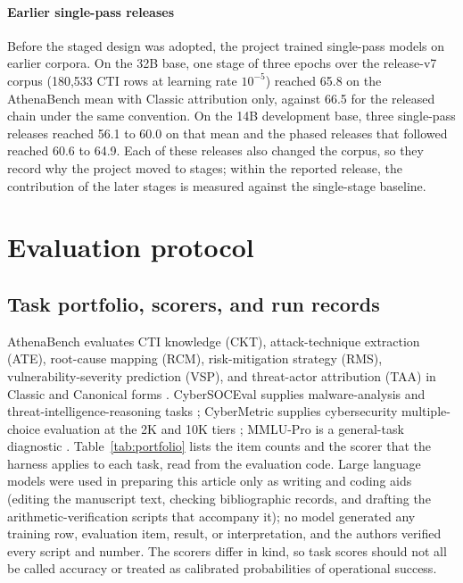 \documentclass[twocolumn]{svjour3}
\begin{document}
\paragraph{Earlier single-pass releases}
Before the staged design was adopted, the project trained single-pass models on earlier corpora. On the 32B base, one stage of three epochs over the release-v7 corpus (180,533 CTI rows at learning rate $10^{-5}$) reached 65.8 on the AthenaBench mean with Classic attribution only, against 66.5 for the released chain under the same convention. On the 14B development base, three single-pass releases reached 56.1 to 60.0 on that mean and the phased releases that followed reached 60.6 to 64.9. Each of these releases also changed the corpus, so they record why the project moved to stages; within the reported release, the contribution of the later stages is measured against the single-stage baseline.


\section{Evaluation protocol}\label{sec:evaluation}
\subsection{Task portfolio, scorers, and run records}
AthenaBench evaluates CTI knowledge (CKT), attack-technique extraction (ATE), root-cause mapping (RCM), risk-mitigation strategy (RMS), vulnerability-severity prediction (VSP), and threat-actor attribution (TAA) in Classic and Canonical forms \cite{alam2025athenabench}. CyberSOCEval supplies malware-analysis and threat-intelligence-reasoning tasks \cite{deason2025cybersoceval}; CyberMetric supplies cybersecurity multiple-choice evaluation at the 2K and 10K tiers \cite{tihanyi2024cybermetric}; MMLU-Pro is a general-task diagnostic \cite{wang2024mmlupro}. Table~\ref{tab:portfolio} lists the item counts and the scorer that the harness applies to each task, read from the evaluation code. Large language models were used in preparing this article only as writing and coding aids (editing the manuscript text, checking bibliographic records, and drafting the arithmetic-verification scripts that accompany it); no model generated any training row, evaluation item, result, or interpretation, and the authors verified every script and number. The scorers differ in kind, so task scores should not all be called accuracy or treated as calibrated probabilities of operational success.
\end{document}
